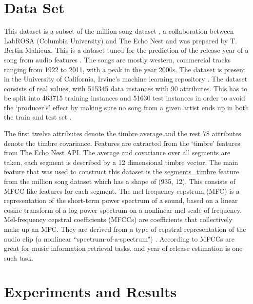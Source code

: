 \documentclass{article} %
\begin{document}
\section{Data Set} 
This dataset is a subset of the million song dataset \cite{msd_site}, a collaboration between LabROSA (Columbia University) and The Echo Nest and was prepared by T. Bertin-Mahieux. This is a dataset tuned for the prediction of the release year of a song from audio features \cite{uci_dataset}. The songs are mostly western, commercial tracks ranging from 1922 to 2011, with a peak in the year 2000s. The dataset is present in the University of California, Irvine's machine learning repository \cite{uci_ml_repo}. The dataset consists of real values, with 515345 data instances with 90 attributes. This has to be split into 463715 training instances and 51630 test instances in order to avoid the `producer's' effect by making sure no song from a given artist ends up in both the train and test set \cite{uci_dataset}. 

The first twelve attributes denote the timbre average and the rest 78 attributes denote the timbre covariance. Features are extracted from the `timbre' features from The Echo Nest API. The average and covariance over all segments are taken, each segment is described by a 12 dimensional timbre vector. The main feature that was used to construct this dataset is the \url{segments_timbre} feature from the million song dataset which has a shape of (935, 12). This consists of MFCC-like features for each segment. The mel-frequency cepstrum (MFC) is a representation of the short-term power spectrum of a sound, based on a linear cosine transform of a log power spectrum on a nonlinear mel scale of frequency. Mel-frequency cepstral coefficients (MFCCs) are coefficients that collectively make up an MFC. They are derived from a type of cepstral representation of the audio clip (a nonlinear ``spectrum-of-a-spectrum") \cite{wiki_mfcc}. According to \cite{inforet} MFCCs are great for music information retrieval tasks, and year of release estimation is one such task. 

\section{Experiments and Results}
\end{document}
